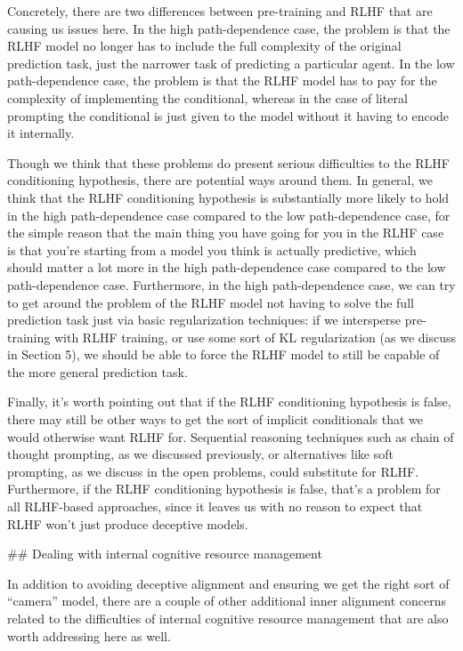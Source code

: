 {Concretely, there are two differences between pre-training and RLHF that are causing us issues here. In the high path-dependence case, the problem is that the RLHF model no longer has to include the full complexity of the original prediction task, just the narrower task of predicting a particular agent. In the low path-dependence case, the problem is that the RLHF model has to pay for the complexity of implementing the conditional, whereas in the case of literal prompting the conditional is just given to the model without it having to encode it internally.

Though we think that these problems do present serious difficulties to the RLHF conditioning hypothesis, there are potential ways around them. In general, we think that the RLHF conditioning hypothesis is substantially more likely to hold in the high path-dependence case compared to the low path-dependence case, for the simple reason that the main thing you have going for you in the RLHF case is that you're starting from a model you think is actually predictive, which should matter a lot more in the high path-dependence case compared to the low path-dependence case. Furthermore, in the high path-dependence case, we can try to get around the problem of the RLHF model not having to solve the full prediction task just via basic regularization techniques: if we intersperse pre-training with RLHF training, or use some sort of KL regularization (as we discuss in Section 5\cite{TODO: cite TODO}), we should be able to force the RLHF model to still be capable of the more general prediction task.

Finally, it's worth pointing out that if the RLHF conditioning hypothesis is false, there may still be other ways to get the sort of implicit conditionals that we would otherwise want RLHF for. Sequential reasoning techniques such as chain of thought prompting, as we discussed previously\cite{TODO: cite TODO}, or alternatives like soft prompting, as we discuss in the open problems\cite{TODO: cite TODO}, could substitute for RLHF. Furthermore, if the RLHF conditioning hypothesis is false, that's a problem for all RLHF-based approaches, since it leaves us with no reason to expect that RLHF won't just produce deceptive models.


## Dealing with internal cognitive resource management

In addition to avoiding deceptive alignment and ensuring we get the right sort of ``camera'' model, there are a couple of other additional inner alignment concerns related to the difficulties of internal cognitive resource management that are also worth addressing here as well.

}
